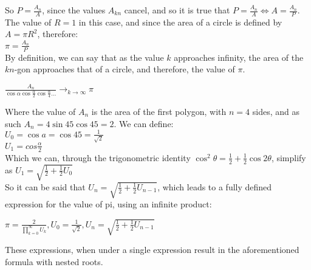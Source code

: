 So $P = \frac{A_{n}}{A}$, since the values $A_{kn}$ cancel, and 
so it is true that $P = \frac{A_{n}}{A} \Leftrightarrow A = \frac{A_{n}}{P}$. The 
value of $R = 1$ in this case, and since the area of a circle is defined 
by $A = \pi R^2$, therefore: \\
$\pi = \frac{A_{n}}{P}$ \\
By definition, we can say that as the value $k$ approaches infinity, the area of the $kn$-gon 
approaches that of a circle, and therefore, the value of $\pi$.

$\frac{A_{n}}{\cos{\alpha} \cos{\frac{\alpha}{2}} \cos{\frac{\alpha}{4}} \dots}
\to_{k \to \infty} \pi$

Where the value of $A_{n}$ is the area of the first polygon, with $n=4$ sides, and as such 
$A_{n} = 4 \sin{45} \cos{45} = 2$. We can define: \\
$U_{0} = \cos{a} = \cos{45} = \frac{1}{\sqrt{2}}$ \\
$U_{1} = cos{\frac{\alpha}{2}}$ \\
Which we can, through the trigonometric identity 
$\cos^2{\theta} = \frac{1}{2} + \frac{1}{2} \cos{2\theta}$, simplify as
$U_{1} = \sqrt{\frac{1}{2} + \frac{1}{2} U_{0}}$ \\
So it can be said that $U_{n} = \sqrt{\frac{1}{2} + \frac{1}{2} U_{n - 1}}$, which leads to 
a fully defined expression for the value of pi, using an infinite product: 

$\pi = \frac{2}{\prod\limits_{k=0}^\infty U_{k}}, U_{0} = \frac{1}{\sqrt{2}}, U_{n} = \sqrt{\frac{1}{2} + \frac{1}{2} U_{n - 1}}$ \footnotemark

These expressions, when under a single expression result in the aforementioned 
formula with nested roots.  



